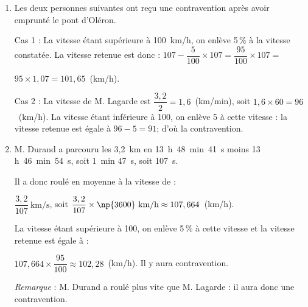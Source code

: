 \begin{enumerate}
\item Les deux personnes suivantes ont reçu une contravention après avoir emprunté le pont d'Oléron. 

Cas 1 : %
La vitesse étant supérieure à 100~km/h, on enlève 5\,\% à la vitesse constatée.
La vitesse retenue est donc : $107 - \dfrac{5}{100}\times 107 = \dfrac{95}{100} \times 107 =$

$ 95 \times 1,07 = 101,65$~(km/h).

Cas 2 : %
La vitesse de M. Lagarde est $\dfrac{3,2}{2} = 1,6$~(km/min), soit $1,6 \times 60 = 96$~(km/h). La vitesse étant inférieure à 100, on enlève 5 à cette vitesse : la vitesse retenue est égale à $96 - 5 = 91$; d'où la contravention.
\item %


M. Durand a parcouru les 3,2~km en 13~h~48~min~41~s moins 13 h~46~min~54~s, soit 1~min 47~s, soit 107~s.

Il a donc roulé en moyenne à la vitesse de :

$\dfrac{3,2}{107}~\text{km/s}$, soit $\dfrac{3,2}{107} \times \np{3600}~\text{km/h} \approx 107,664$~(km/h).

La vitesse étant supérieure à 100, on enlève 5\,\% à cette vitesse et la vitesse retenue est égale à :

$107,664 \times \dfrac{95}{100} \approx 102,28$~(km/h). Il y aura contravention.

\emph{Remarque} : M. Durand a roulé plus vite que M. Lagarde : il aura donc une contravention.
\end{enumerate}

\vspace{0.5cm}

